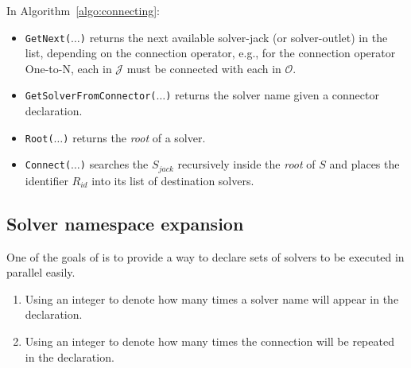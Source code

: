 In Algorithm~\ref{algo:connecting}:
\begin{itemize}
\item \texttt{GetNext($\dots$)} returns the next available solver-jack (or solver-outlet) in the list, depending on the connection operator, e.g., for the connection operator One-to-N, each \jack{} in $\mathcal{J}$ must be connected with each \outlet{} in $\mathcal{O}$.
\item \texttt{GetSolverFromConnector($\dots$)} returns the solver name given a connector declaration.
\item \texttt{Root($\dots$)} returns the {\it root} \cm{} of a solver.
\item \texttt{Connect($\dots$)} %
searches the \om{} $S_{jack}$ recursively inside the {\it root} \cm{} of $S$ and places the identifier $R_{id}$ into its list of destination solvers.
\end{itemize}


\subsection{Solver namespace expansion}

One of the goals of \posl{} is to provide a way to declare sets of solvers to be executed in parallel easily. %
\begin{enumerate}
\item Using an integer to denote how many times a solver name will appear in the declaration.
\item Using an integer to denote how many times the connection will be repeated in the declaration.
\end{enumerate}

